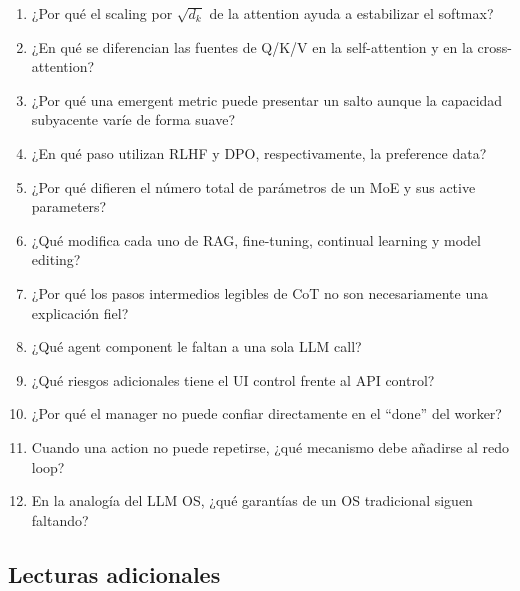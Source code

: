 \documentclass[a4paper]{article}
\begin{document}
\begin{enumerate}
  \item ¿Por qué el scaling por $\sqrt{d_k}$ de la attention ayuda a estabilizar el softmax?
  \item ¿En qué se diferencian las fuentes de Q/K/V en la self-attention y en la cross-attention?
  \item ¿Por qué una emergent metric puede presentar un salto aunque la capacidad subyacente varíe de forma suave?
  \item ¿En qué paso utilizan RLHF y DPO, respectivamente, la preference data?
  \item ¿Por qué difieren el número total de parámetros de un MoE y sus active parameters?
  \item ¿Qué modifica cada uno de RAG, fine-tuning, continual learning y model editing?
  \item ¿Por qué los pasos intermedios legibles de CoT no son necesariamente una explicación fiel?
  \item ¿Qué agent component le faltan a una sola LLM call?
  \item ¿Qué riesgos adicionales tiene el UI control frente al API control?
  \item ¿Por qué el manager no puede confiar directamente en el ``done'' del worker?
  \item Cuando una action no puede repetirse, ¿qué mecanismo debe añadirse al redo loop?
  \item En la analogía del LLM OS, ¿qué garantías de un OS tradicional siguen faltando?
\end{enumerate}

\subsection{Lecturas adicionales}
\end{document}

